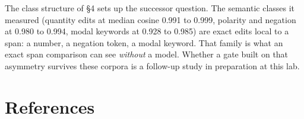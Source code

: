 \documentclass[11pt]{article}
\begin{document}
The class structure of \S4 sets up the successor question. The semantic classes it measured (quantity edits at median cosine 0.991 to 0.999, polarity and negation at 0.980 to 0.994, modal keywords at 0.928 to 0.985) are exact edits local to a span: a number, a negation token, a modal keyword. That family is what an exact span comparison can see \emph{without} a model. Whether a gate built on that asymmetry survives these corpora is a follow-up study in preparation at this lab.

\section*{References}

\par\vspace{6pt}
\end{document}
